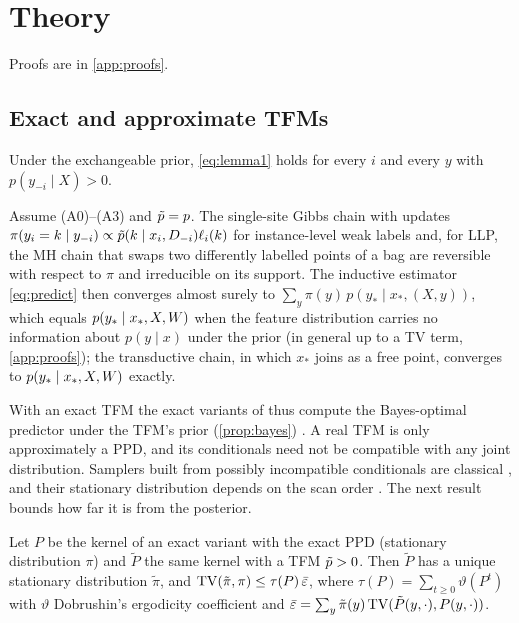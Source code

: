 \section{Theory}\label{sec:theory}
Proofs are in \cref{app:proofs}.
\subsection{Exact and approximate TFMs}
\begin{lemma}\label{lem:fullcond}
Under the exchangeable prior, \eqref{eq:lemma1} holds for every $i$ and every $y$ with $p(y_{-i}\mid X)>0$.
\end{lemma}
\vspace{-0.6ex}
\begin{theorem}[Exactness]\label{thm:exact}
Assume (A0)--(A3) and $\tilde p=p$. The single-site Gibbs chain with updates
$\pi(y_i=k\mid y_{-i})\propto\tilde p(k\mid x_i,D_{-i})\ell_i(k)$ for instance-level weak labels and, for LLP, the MH chain
that swaps two differently labelled points of a bag are reversible with respect to $\pi$ and irreducible on its
support. The inductive estimator \eqref{eq:predict} then converges almost surely to
$\sum_y\pi(y)\,p(y_*\mid x_*,(X,y))$, which equals $p(y_*\mid x_*,X,W)$ when the feature distribution carries no
information about $p(y\mid x)$ under the prior (in general up to a TV term, \cref{app:proofs}); the transductive chain,
in which $x_*$ joins as a free point, converges to $p(y_*\mid x_*,X,W)$ exactly.
\end{theorem}

With an exact TFM the exact variants of \ours{} thus compute the Bayes-optimal predictor under the TFM's prior
(\cref{prop:bayes}) . A real TFM is only approximately a PPD, and its conditionals need not be
compatible with any joint distribution. Samplers built from possibly incompatible conditionals are classical
\citep{heckerman2000,liu2014}, and their stationary distribution depends on the scan order \citep{chen2015gibbs}. The
next result bounds how far it is from the posterior.

\begin{theorem}\label{thm:stability}
Let $P$ be the kernel of an exact variant with the exact PPD (stationary distribution $\pi$) and $\tilde P$ the same
kernel with a TFM $\tilde p>0$. Then $\tilde P$ has a unique stationary distribution $\tilde\pi$, and
$\mathrm{TV}(\tilde\pi,\pi)\le\tau(P)\,\bar\varepsilon$, where $\tau(P)=\sum_{t\ge0}\vartheta(P^t)$ with $\vartheta$ Dobrushin's
ergodicity coefficient and $\bar\varepsilon=\sum_y\tilde\pi(y)\,\mathrm{TV}(\tilde P(y,\cdot),P(y,\cdot))$.
\end{theorem}

